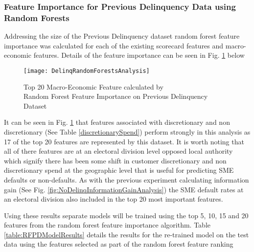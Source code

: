 \subsubsection{Feature Importance for Previous Delinquency Data using Random Forests}\label{RFPDExper}
Addressing the size of the Previous Delinquency dataset random forest feature importance was calculated for
each of the existing scorecard features and macro-economic features. Details of the feature importance can be seen in Fig. \ref{fig:DelinqRandomForestsAnalysis} below

\begin{figure}[H]
	\texttt{[image: DelinqRandomForestsAnalysis]}
	\caption{Top 20 Macro-Economic Feature calculated by \\
		Random Forest Feature Importance on Previous Delinquency Dataset}
	\label{fig:DelinqRandomForestsAnalysis}
\end{figure}

It can be seen in Fig. \ref{fig:DelinqRandomForestsAnalysis} that features associated with discretionary and non discretionary (See Table \ref{discretionarySpend}) perform strongly in this analysis as 17 of the top 20 features are represented by this dataset. It is worth noting that all of there features are at an electoral division level opposed local authority which signify there has been some shift in customer discretionary and non discretionary spend at the geographic level that is useful for predicting SME defaults or non-defaults. As with the previous experiment calculating information gain  (See Fig. \ref{fig:NoDelinqInformationGainAnalysis}) the SME default rates at an electoral division also included in the top 20 most important features.

Using these results separate models will be trained using the top 5, 10, 15 and 20 features from
the random forest feature importance algorithm. Table \ref{table:RFPDModelResults} details the results for the re-trained model
on the test data using the features selected as part of the random forest feature ranking

